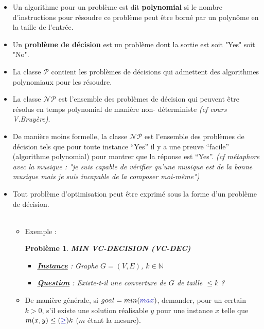 \documentclass{article}
\newcommand{\titre}[1]{\textcolor{title}{#1}}
\newcommand{\blu}[1]{\textcolor{darkblue}{#1}}
\newcommand{\N}{\mathbb{N}}
\newtheorem{pbm}{Problème}[section]
\begin{document}
\begin{sffamily}
\begin{itemize}
\item Un algorithme pour un problème est dit \textbf{polynomial} si le nombre d'instructions pour résoudre ce problème peut être borné par 
un polynôme en la taille de l'entrée.
\item Un \textbf{problème de décision} est un problème dont la sortie est soit "Yes" soit "No".
\item La classe $\mathcal{P}$ contient les problèmes de décisions qui admettent des algorithmes polynomiaux pour les résoudre.
\item La classe $\mathcal{NP}$ est l'ensemble des problèmes de décision qui peuvent être résolus en temps polynomial de manière non-
déterministe \textit{(cf cours V.Bruyère)}.
\item De manière moins formelle, la classe $\mathcal{NP}$ est l'ensemble des problèmes de décision tels que pour toute instance ``Yes'' 
il y a une preuve ``facile'' (algorithme polynomial) pour montrer que la réponse est ``Yes''. \textit{(cf métaphore avec la musique : "je 
suis capable de vérifier qu'une musique est de la bonne musique mais je suis incapable de la composer moi-même")}
\item Tout problème d'optimisation peut être exprimé sous la forme d'un problème de décision. \\$ $\\
\begin{itemize}
\item[$\rightarrow$] Exemple : \\
\indent \hbox{}
\begin{pbm}
\textbf{MIN VC-DECISION (\titre{VC-DEC})}
\begin{itemize}
\item[*]\textbf{\underline{Instance}} : Graphe $G=(V,E)$, $k \in \N$
\item[*]\textbf{\underline{Question}} : Existe-t-il une converture de $G$ de taille $\leq k$ ?
\end{itemize}
\indent \hbox{}
\end{pbm}
\item[$\rightarrow$] De manière générale, si $goal=min(\blu{max})$, demander, pour un certain $k>0$, s'il existe une solution réalisable
$y$ pour une instance $x$ telle que $m(x,y) \leq (\blu{\geq}) k$ ($m$ étant la mesure).
\end{itemize}
\end{itemize}


\end{sffamily}
\end{document}
